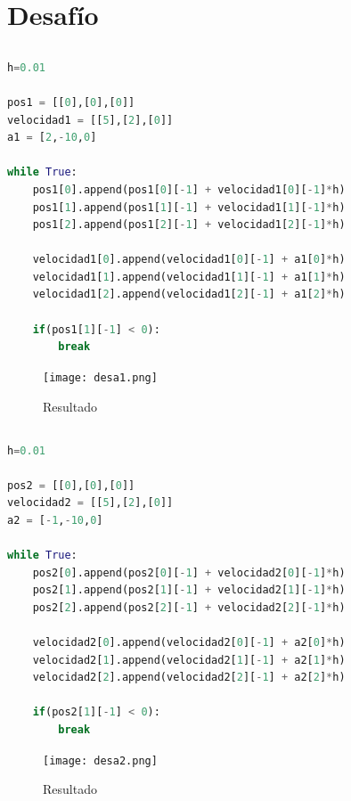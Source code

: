 \documentclass{article}
\begin{document}
\section{Desafío}
\subsection{}
\begin{lstlisting}[language=Python,caption=Desafío 1.1]
h=0.01

pos1 = [[0],[0],[0]]
velocidad1 = [[5],[2],[0]]
a1 = [2,-10,0]

while True:
    pos1[0].append(pos1[0][-1] + velocidad1[0][-1]*h)
    pos1[1].append(pos1[1][-1] + velocidad1[1][-1]*h)
    pos1[2].append(pos1[2][-1] + velocidad1[2][-1]*h)

    velocidad1[0].append(velocidad1[0][-1] + a1[0]*h)
    velocidad1[1].append(velocidad1[1][-1] + a1[1]*h)
    velocidad1[2].append(velocidad1[2][-1] + a1[2]*h)

    if(pos1[1][-1] < 0):
        break
\end{lstlisting}
\begin{figure}[H]
    \centering
    \texttt{[image: desa1.png]}
    \caption{Resultado}
\end{figure}
\subsection{}
\begin{lstlisting}[language=Python,caption=Desafío 1.2]
h=0.01

pos2 = [[0],[0],[0]]
velocidad2 = [[5],[2],[0]]
a2 = [-1,-10,0]

while True:
    pos2[0].append(pos2[0][-1] + velocidad2[0][-1]*h)
    pos2[1].append(pos2[1][-1] + velocidad2[1][-1]*h)
    pos2[2].append(pos2[2][-1] + velocidad2[2][-1]*h)

    velocidad2[0].append(velocidad2[0][-1] + a2[0]*h)
    velocidad2[1].append(velocidad2[1][-1] + a2[1]*h)
    velocidad2[2].append(velocidad2[2][-1] + a2[2]*h)

    if(pos2[1][-1] < 0):
        break
\end{lstlisting}
\begin{figure}[H]
    \centering
    \texttt{[image: desa2.png]}
    \caption{Resultado}
\end{figure}
\end{document}
